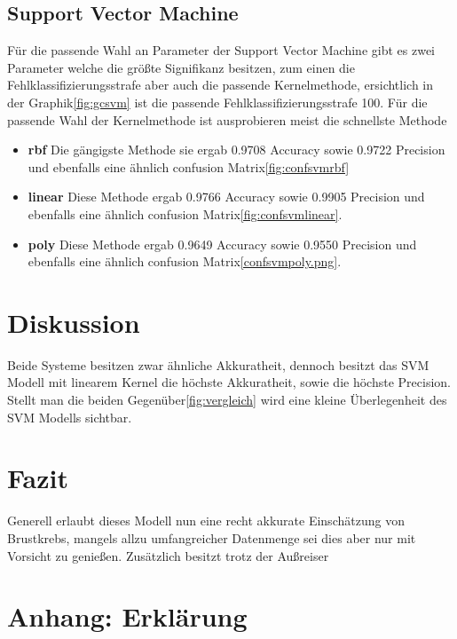 \documentclass[a4paper,12pt]{article}
\begin{document}
\subsection{Support Vector Machine}
Für die passende Wahl an Parameter der Support Vector Machine gibt es zwei Parameter welche die größte Signifikanz besitzen, zum einen
die Fehlklassifizierungsstrafe aber auch die passende Kernelmethode, ersichtlich in der Graphik\ref{fig:gcsvm} ist die passende Fehlklassifizierungsstrafe
100. Für die passende Wahl der Kernelmethode ist ausprobieren meist die schnellste Methode

\begin{itemize}
    \item \textbf{rbf} Die gängigste Methode sie ergab 0.9708 Accuracy sowie 0.9722 Precision und ebenfalls eine ähnlich confusion Matrix\ref{fig:confsvmrbf}

    \item \textbf{linear} Diese Methode ergab 0.9766 Accuracy sowie 0.9905 Precision und ebenfalls eine ähnlich confusion Matrix\ref{fig:confsvmlinear}.\newline

    \item \textbf{poly} Diese Methode ergab 0.9649 Accuracy sowie 0.9550 Precision und ebenfalls eine ähnlich confusion Matrix\ref{confsvmpoly.png}.\newline

\end{itemize}
\section{Diskussion}
Beide Systeme besitzen zwar ähnliche Akkuratheit, dennoch besitzt das SVM Modell mit linearem Kernel die höchste Akkuratheit, sowie die höchste
Precision. Stellt man die beiden Gegenüber\ref{fig:vergleich} wird eine kleine Überlegenheit des SVM Modells sichtbar.

\section{Fazit}
Generell erlaubt dieses Modell nun eine recht akkurate Einschätzung von Brustkrebs, mangels allzu umfangreicher Datenmenge sei dies
aber nur mit Vorsicht zu genießen. Zusätzlich besitzt trotz der Außreiser
\newpage

\appendix
\section{Anhang: Erklärung}
\end{document}
